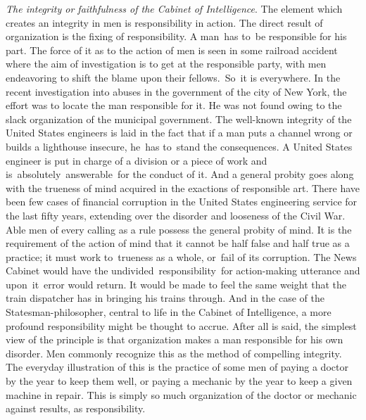 \documentclass[openany,nobib]{tufte-book}
\begin{document}
\emph{The integrity or faithfulness of the Cabinet of Intelligence}. The
element which creates an integrity in men is responsibility in action.
The direct result of organization is the fixing of responsibility. A
man~has to~be responsible for his part. The force of it as to the action
of men is seen in some railroad accident where the aim of investigation
is to get at the responsible party, with men endeavoring to shift the
blame upon their fellows.~So~it is everywhere. In the recent
investigation into abuses in the government of the city of New York, the
effort was to locate the man responsible for it. He was not found owing
to the slack organization of the municipal government. The well-known
integrity of the United States engineers is laid in the fact that if a
man puts a channel wrong or builds a lighthouse insecure, he~has
to~stand the consequences. A United States engineer is put in charge of
a division or a piece of work and is~absolutely~answerable~for the
conduct of it. And a general probity goes along with the trueness of
mind acquired in the exactions of responsible art. There have been few
cases of financial corruption in the United States engineering service
for the last fifty years, extending over the disorder and looseness of
the Civil War. Able men of every calling as a rule possess the general
probity of mind. It is the requirement of the action of mind that it
cannot be half false and half true as a practice; it must work
to~trueness as a whole, or~fail of its corruption. The News Cabinet
would have the undivided~responsibility~for action-making utterance and
upon~it~error would return. It would be made to feel the same weight
that the train dispatcher has in bringing his trains through. And in the
case of the Statesman-philosopher, central to life in the Cabinet of
Intelligence, a more profound responsibility might be thought to accrue.
After all is said, the simplest view of the principle is that
organization makes a man responsible for his own disorder. Men commonly
recognize this as the method of compelling integrity. The everyday
illustration of this is the practice of some men of paying a doctor by
the year to keep them well, or paying a mechanic by the year to keep a
given machine in repair. This is simply so much organization of the
doctor or mechanic against results, as responsibility.~
\end{document}
